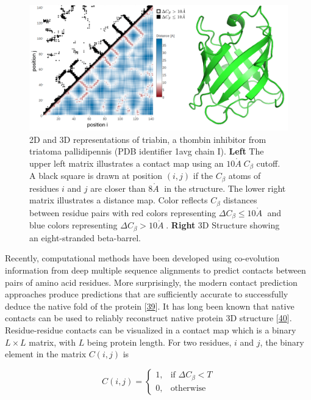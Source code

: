 \documentclass[11pt,a4paper,twoside]{book}
\newcommand{\Cb}{C_\beta}
\newcommand{\angstrom}{\mathring{A} \;}
\theoremstyle{definition}
\theoremstyle{definition}
\theoremstyle{remark}
\begin{document}
\begin{figure}

{\centering \includegraphics[width=1\linewidth]{img/intro/contat_map_and_structure_1avgi00} 

}

\caption{2D and 3D representations of triabin, a
thombin inhibitor from triatoma pallidipennis (PDB identifier 1avg chain
I). \textbf{Left} The upper left matrix illustrates a contact map using
an \(10 \angstrom \Cb\) cutoff. A black square is drawn at position
\((i, j)\) if the \(\Cb\) atoms of residues \(i\) and \(j\) are closer
than \(8 \angstrom\) in the structure. The lower right matrix
illustrates a distance map. Color reflects \(\Cb\) distances between
residue pairs with red colors representing
\(\Delta \Cb \le 10 \angstrom\) and blue colors representing
\(\Delta \Cb > 10 \angstrom\). \textbf{Right} 3D Structure showing an
eight-stranded beta-barrel.}\label{fig:contact-map}
\end{figure}

Recently, computational methods have been developed using co-evolution
information from deep multiple sequence alignments to predict contacts
between pairs of amino acid residues. More surprisingly, the modern
contact prediction approaches produce predictions that are sufficiently
accurate to successfully deduce the native fold of the protein
{[}\protect\hyperlink{ref-Marks2011}{39}{]}. It has long been known that
native contacts can be used to reliably reconstruct native protein 3D
structure {[}\protect\hyperlink{ref-Vendruscolo1997}{40}{]}.
Residue-residue contacts can be visualized in a contact map which is a
binary \(L \times L\) matrix, with \(L\) being protein length. For two
residues, \(i\) and \(j\), the binary element in the matrix \(C(i,j)\)
is

\begin{equation}
    C(i,j) =    
    \begin{cases}
        1, & \text{if } \Delta \Cb < T \\
        0, & \text{otherwise}
    \end{cases}
\end{equation}
\end{document}
